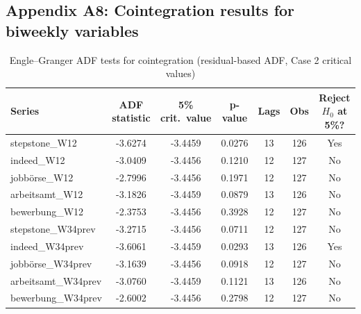 \documentclass[12pt,a4paper]{article}
\begin{document}
\subsection{Appendix A8: Cointegration results for biweekly variables}
\begin{table}[htbp]
\centering
\caption{Engle--Granger ADF tests for cointegration (residual-based ADF, Case 2 critical values)}
\label{tab:eg_results}
\begin{tabular}{lcccccc}
\hline\hline
Series & ADF statistic & 5\% crit.\ value & p-value & Lags & Obs & Reject $H_0$ at 5\%? \\
\hline
stepstone\_W12      & -3.6274 & -3.4459 & 0.0276 & 13 & 126 & Yes \\
indeed\_W12         & -3.0409 & -3.4456 & 0.1210 & 12 & 127 & No  \\
jobbörse\_W12       & -2.7996 & -3.4456 & 0.1971 & 12 & 127 & No  \\
arbeitsamt\_W12     & -3.1826 & -3.4459 & 0.0879 & 13 & 126 & No  \\
bewerbung\_W12      & -2.3753 & -3.4456 & 0.3928 & 12 & 127 & No  \\
stepstone\_W34prev  & -3.2715 & -3.4456 & 0.0711 & 12 & 127 & No  \\
indeed\_W34prev     & -3.6061 & -3.4459 & 0.0293 & 13 & 126 & Yes \\
jobbörse\_W34prev   & -3.1639 & -3.4456 & 0.0918 & 12 & 127 & No  \\
arbeitsamt\_W34prev & -3.0760 & -3.4459 & 0.1121 & 13 & 126 & No  \\
bewerbung\_W34prev  & -2.6002 & -3.4456 & 0.2798 & 12 & 127 & No  \\
\hline\hline
\end{tabular}
\end{table}
\end{document}
